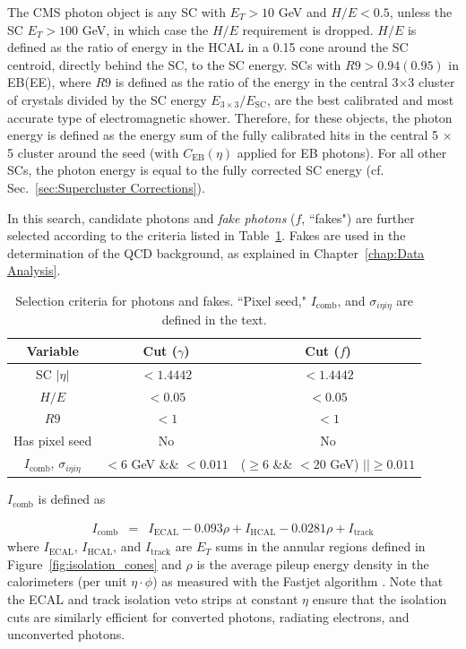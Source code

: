 \documentclass[dissertation.tex]{subfiles}
\begin{document}
The CMS photon object is any SC with $E_{T} > 10$ GeV and $H/E < 0.5$, unless the SC $E_{T} > 100$ GeV, in which case the $H/E$ requirement is dropped.  $H/E$ is defined as the ratio of energy in the HCAL in a 0.15 cone around the SC centroid, directly behind the SC, to the SC energy.  SCs with $R9 > 0.94(0.95)$ in EB(EE), where $R9$ is defined as the ratio of the energy in the central 3$\times$3 cluster of crystals divided by the SC energy $E_{3\times 3}/E_{\mathrm{SC}}$, are the best calibrated and most accurate type of electromagnetic shower.  Therefore, for these objects, the photon energy is defined as the energy sum of the fully calibrated hits in the central 5 $\times$ 5 cluster around the seed (with $C_{\mathrm{EB}}(\eta)$ applied for EB photons).  For all other SCs, the photon energy is equal to the fully corrected SC energy (cf. Sec.~\ref{sec:Supercluster Corrections}).

In this search, candidate photons and \textit{fake photons} ($\mathit{f}$, ``fakes") are further selected according to the criteria listed in Table~\ref{tab:g_f_criteria}.  Fakes are used in the determination of the QCD background, as explained in Chapter~\ref{chap:Data Analysis}.

\begin{table}[hcbp]
\caption{Selection criteria for photons and fakes.  ``Pixel seed," $I_{\mathrm{comb}}$, and $\sigma_{i\eta i\eta}$ are defined in the text.}
\centering
\begin{tabular}{|c|c|c|}
\hline
Variable & Cut ($\gamma$) & Cut ($\mathit{f}$) \\
\hline
\hline
SC $|\eta|$ & $< 1.4442$ & $<1.4442$ \\
\hline
$H/E$ & $<0.05$ & $<0.05$ \\
\hline
$R9$ & $< 1$ & $< 1$ \\
\hline
Has pixel seed & No & No \\
\hline
$I_{\mathrm{comb}}$, $\sigma_{i\eta i\eta}$ & $< 6$ GeV \&\& $< 0.011$ & ($\geq 6$ \&\& $< 20$ GeV) $|| \geq 0.011$ \\
\hline
\end{tabular}
\label{tab:g_f_criteria}
\end{table}

\marginpar{\textcolor{blue}{Updated effective area}}$I_{\mathrm{comb}}$ is defined as

\begin{eqnarray}
I_{\mathrm{comb}} &=& I_{\mathrm{ECAL}} - 0.093\rho + I_{\mathrm{HCAL}} - 0.0281\rho + I_{\mathrm{track}}
\end{eqnarray}
%
where $I_{\mathrm{ECAL}}$, $I_{\mathrm{HCAL}}$, and $I_{\mathrm{track}}$ are $E_{T}$ sums in the annular regions defined in Figure~\ref{fig:isolation_cones} and $\rho$ is the average pileup energy density in the calorimeters (per unit $\eta\cdot\phi$) as measured with the Fastjet algorithm \cite{Fastjet_conf_proceedings, Fastjet_manual}.  Note that the ECAL and track isolation veto strips at constant $\eta$ ensure that the isolation cuts are similarly efficient for converted photons, radiating electrons, and unconverted photons.
\end{document}
